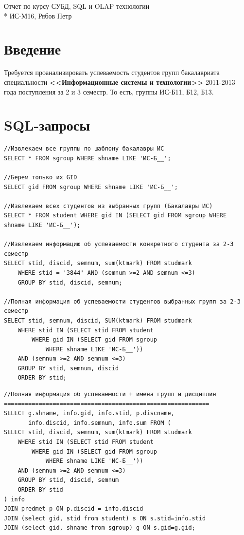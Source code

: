 \documentclass[12pt]{article}\usepackage[]{graphicx}\usepackage[]{color}
\begin{document}
\begin{center}
	Отчет по курсу СУБД, SQL и OLAP технологии \\* ИС-М16, Рябов Петр
\end{center}	

\tableofcontents
\newpage
\section*{Введение}
Требуется проанализировать успеваемость студентов групп бакалавриата специальности \textbf{<<Информационные системы и технологии>>} 2011-2013 года поступления за 2 и 3 семестр. То есть, группы ИС-Б11, Б12, Б13.
\section{SQL-запросы}

\begin{Verbatim}
//Извлекаем все группы по шаблону бакалавры ИС
SELECT * FROM sgroup WHERE shname LIKE 'ИС-Б__';

//Берем только их GID
SELECT gid FROM sgroup WHERE shname LIKE 'ИС-Б__';

//Извлекаем всех студентов из выбранных групп (Бакалавры ИС)
SELECT * FROM student WHERE gid IN (SELECT gid FROM sgroup WHERE shname LIKE 'ИС-Б__');

//Извлекаем информацию об успеваемости конкретного студента за 2-3 семестр
SELECT stid, discid, semnum, sum(ktmark) FROM studmark
    WHERE stid = '3844' AND (semnum >=2 AND semnum <=3)
    GROUP BY stid, discid, semnum;

//Полная информация об успеваемости студентов выбранных групп за 2-3 семестр
SELECT stid, semnum, discid, SUM(ktmark) FROM studmark
	WHERE stid IN (SELECT stid FROM student
		WHERE gid IN (SELECT gid FROM sgroup
			WHERE shname LIKE 'ИС-Б__')) 
	AND (semnum >=2 AND semnum <=3)
	GROUP BY stid, semnum, discid
	ORDER BY stid;
\end{Verbatim}

\begin{Verbatim}
//Полная информация об успеваемости + имена групп и дисциплин
===========================================================
SELECT g.shname, info.gid, info.stid, p.discname,
       info.discid, info.semnum, info.sum FROM (  
SELECT stid, discid, semnum, sum(ktmark) FROM studmark
	WHERE stid IN (SELECT stid FROM student
		WHERE gid IN (SELECT gid FROM sgroup
			WHERE shname LIKE 'ИС-Б__')) 
	AND (semnum >=2 AND semnum <=3)
	GROUP BY stid, discid, semnum
	ORDER BY stid
) info
JOIN predmet p ON p.discid = info.discid
JOIN (select gid, stid from student) s ON s.stid=info.stid
JOIN (select gid, shname from sgroup) g ON s.gid=g.gid;
\end{Verbatim}
\end{document}
